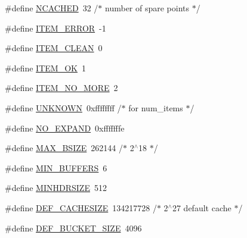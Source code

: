 \begin{DoxyCompactItemize}
\item 
\#define \mbox{\hyperlink{adat-devel_2other__libs_2filedb_2filehash_2ffdb__hash_8h_a2a0096aff8f4e93a03a33f31917b4067}{N\+C\+A\+C\+H\+ED}}~32		/$\ast$ number of spare points $\ast$/
\item 
\#define \mbox{\hyperlink{adat-devel_2other__libs_2filedb_2filehash_2ffdb__hash_8h_a8f8f160a938a5d7b712523e99d944047}{I\+T\+E\+M\+\_\+\+E\+R\+R\+OR}}~-\/1
\item 
\#define \mbox{\hyperlink{adat-devel_2other__libs_2filedb_2filehash_2ffdb__hash_8h_abbbc72c3da7b8cd4d8b2e0240657617c}{I\+T\+E\+M\+\_\+\+C\+L\+E\+AN}}~0
\item 
\#define \mbox{\hyperlink{adat-devel_2other__libs_2filedb_2filehash_2ffdb__hash_8h_a723337f9321eb273f782eaf4d483a60f}{I\+T\+E\+M\+\_\+\+OK}}~1
\item 
\#define \mbox{\hyperlink{adat-devel_2other__libs_2filedb_2filehash_2ffdb__hash_8h_a40b8e62aa275093cf36a6cc3490ca125}{I\+T\+E\+M\+\_\+\+N\+O\+\_\+\+M\+O\+RE}}~2
\item 
\#define \mbox{\hyperlink{adat-devel_2other__libs_2filedb_2filehash_2ffdb__hash_8h_ac1ae4add974b9cfc6b5aaf8a578f01ab}{U\+N\+K\+N\+O\+WN}}~0xffffffff		/$\ast$ for num\+\_\+items $\ast$/
\item 
\#define \mbox{\hyperlink{adat-devel_2other__libs_2filedb_2filehash_2ffdb__hash_8h_a1df3a52d4929691a21f6edf8e7f1eb58}{N\+O\+\_\+\+E\+X\+P\+A\+ND}}~0xfffffffe
\item 
\#define \mbox{\hyperlink{adat-devel_2other__libs_2filedb_2filehash_2ffdb__hash_8h_ad484cac4e6e680d07e55ccaa653409f4}{M\+A\+X\+\_\+\+B\+S\+I\+ZE}}~262144		/$\ast$ 2$^\wedge$18 $\ast$/
\item 
\#define \mbox{\hyperlink{adat-devel_2other__libs_2filedb_2filehash_2ffdb__hash_8h_a043db91ee824c5b245a27b6fbfb63672}{M\+I\+N\+\_\+\+B\+U\+F\+F\+E\+RS}}~6
\item 
\#define \mbox{\hyperlink{adat-devel_2other__libs_2filedb_2filehash_2ffdb__hash_8h_aea6b4256bcdd0d60be24dc6dc8c9e037}{M\+I\+N\+H\+D\+R\+S\+I\+ZE}}~512
\item 
\#define \mbox{\hyperlink{adat-devel_2other__libs_2filedb_2filehash_2ffdb__hash_8h_adcfc11c2e04f16218f368f2ab4528f55}{D\+E\+F\+\_\+\+C\+A\+C\+H\+E\+S\+I\+ZE}}~134217728       /$\ast$ 2$^\wedge$27 default cache $\ast$/
\item 
\#define \mbox{\hyperlink{adat-devel_2other__libs_2filedb_2filehash_2ffdb__hash_8h_a2870136687576cbb7437954d829032f5}{D\+E\+F\+\_\+\+B\+U\+C\+K\+E\+T\+\_\+\+S\+I\+ZE}}~4096

\end{DoxyCompactItemize}
